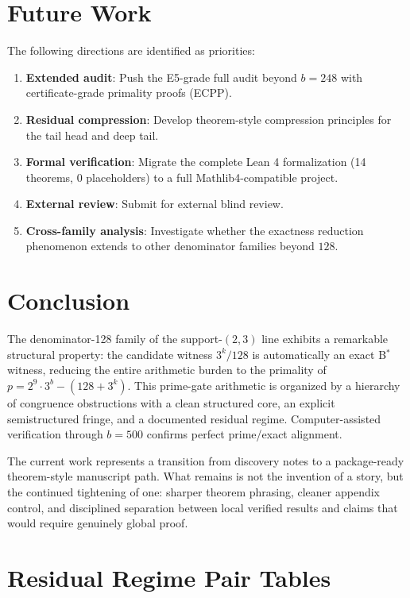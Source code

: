 \documentclass[11pt,letterpaper]{article}
\begin{document}
\section{Future Work}

The following directions are identified as priorities:
\begin{enumerate}
    \item \textbf{Extended audit}: Push the E5-grade full audit beyond $b = 248$ with certificate-grade primality proofs (ECPP).
    \item \textbf{Residual compression}: Develop theorem-style compression principles for the tail head and deep tail.
    \item \textbf{Formal verification}: Migrate the complete Lean 4 formalization (14 theorems, 0 placeholders) to a full Mathlib4-compatible project.
    \item \textbf{External review}: Submit for external blind review.
    \item \textbf{Cross-family analysis}: Investigate whether the exactness reduction phenomenon extends to other denominator families beyond $128$.
\end{enumerate}

\section{Conclusion}

The denominator-128 family of the support-$(2,3)$ line exhibits a remarkable structural property: the candidate witness $3^k/128$ is automatically an exact B$^\ast$ witness, reducing the entire arithmetic burden to the primality of $p = 2^9 \cdot 3^b - (128 + 3^k)$.
This prime-gate arithmetic is organized by a hierarchy of congruence obstructions with a clean structured core, an explicit semistructured fringe, and a documented residual regime.
Computer-assisted verification through $b = 500$ confirms perfect prime/exact alignment.

The current work represents a transition from discovery notes to a package-ready theorem-style manuscript path.
What remains is not the invention of a story, but the continued tightening of one: sharper theorem phrasing, cleaner appendix control, and disciplined separation between local verified results and claims that would require genuinely global proof.

\appendix

\section{Residual Regime Pair Tables}\label{app:residual}
\end{document}
